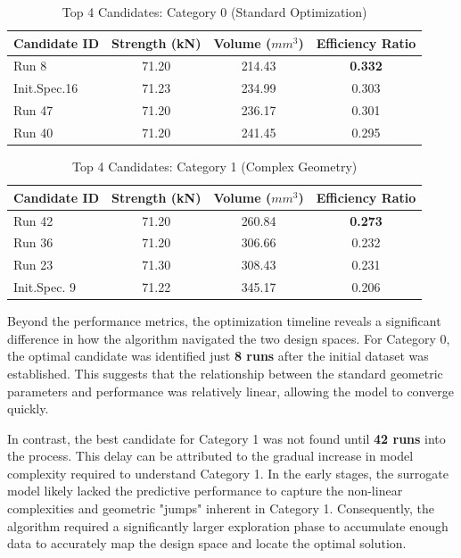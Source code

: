 \documentclass[
  preprint,
  12pt,
  a4paper
]{elsarticle}
\begin{document}
\begin{table}[htbp]
    \centering
    \caption{Top 4 Candidates: Category 0 (Standard Optimization)}
    \label{tab:cat0_candidates}
    \begin{tabular}{l c c c}
        \toprule
        \textbf{Candidate ID} & \textbf{Strength (kN)} & \textbf{Volume ($mm^3$)} & \textbf{Efficiency Ratio} \\
        \midrule
        Run 8 & 71.20 & 214.43 & \textbf{0.332} \\
        Init.Spec.16 & 71.23 & 234.99 & 0.303 \\
        Run 47 & 71.20 & 236.17 & 0.301 \\
        Run 40 & 71.20 & 241.45 & 0.295 \\
        \bottomrule
    \end{tabular}
\end{table}

\begin{table}[htbp]
    \centering
    \caption{Top 4 Candidates: Category 1 (Complex Geometry)}
    \label{tab:cat1_candidates}
    \begin{tabular}{l c c c}
        \toprule
        \textbf{Candidate ID} & \textbf{Strength (kN)} & \textbf{Volume ($mm^3$)} & \textbf{Efficiency Ratio} \\
        \midrule
        Run 42 & 71.20 & 260.84 & \textbf{0.273} \\
        Run 36 & 71.20 & 306.66 & 0.232 \\
        Run 23 & 71.30 & 308.43 & 0.231 \\
        Init.Spec. 9 & 71.22 & 345.17 & 0.206 \\
        \bottomrule
    \end{tabular}
\end{table}


Beyond the performance metrics, the optimization timeline reveals a significant difference in how the algorithm navigated the two design spaces. For Category 0, the optimal candidate was identified just \textbf{8 runs} after the initial dataset was established. This suggests that the relationship between the standard geometric parameters and performance was relatively linear, allowing the model to converge quickly.

In contrast, the best candidate for Category 1 was not found until \textbf{42 runs} into the process. This delay can be attributed to the gradual increase in model complexity required to understand Category 1. In the early stages, the surrogate model likely lacked the predictive performance to capture the non-linear complexities and geometric "jumps" inherent in Category 1. Consequently, the algorithm required a significantly larger exploration phase to accumulate enough data to accurately map the design space and locate the optimal solution.
\end{document}
